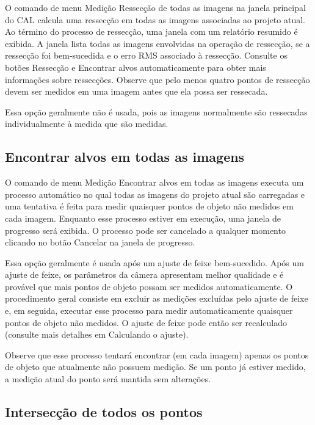 \documentclass[
  12pt,
  letterpaper,
  DIV=11,
  numbers=noendperiod]{scrreprt}
\begin{document}
O comando de menu Medição \textbar{} Ressecção de todas as imagens na
janela principal do CAL calcula uma ressecção em todas as imagens
associadas ao projeto atual. Ao término do processo de ressecção, uma
janela com um relatório resumido é exibida. A janela lista todas as
imagens envolvidas na operação de ressecção, se a ressecção foi
bem-sucedida e o erro RMS associado à ressecção. Consulte os botões
Ressecção e Encontrar alvos automaticamente para obter mais informações
sobre ressecções. Observe que pelo menos quatro pontos de ressecção
devem ser medidos em uma imagem antes que ela possa ser ressecada.

Essa opção geralmente não é usada, pois as imagens normalmente são
ressecadas individualmente à medida que são medidas.

\subsection{Encontrar alvos em todas as
imagens}\label{encontrar-alvos-em-todas-as-imagens-1}

O comando de menu Medição \textbar{} Encontrar alvos em todas as imagens
executa um processo automático no qual todas as imagens do projeto atual
são carregadas e uma tentativa é feita para medir quaisquer pontos de
objeto não medidos em cada imagem. Enquanto esse processo estiver em
execução, uma janela de progresso será exibida. O processo pode ser
cancelado a qualquer momento clicando no botão Cancelar na janela de
progresso.

Essa opção geralmente é usada após um ajuste de feixe bem-sucedido. Após
um ajuste de feixe, os parâmetros da câmera apresentam melhor qualidade
e é provável que mais pontos de objeto possam ser medidos
automaticamente. O procedimento geral consiste em excluir as medições
excluídas pelo ajuste de feixe e, em seguida, executar esse processo
para medir automaticamente quaisquer pontos de objeto não medidos. O
ajuste de feixe pode então ser recalculado (consulte mais detalhes em
Calculando o ajuste).

Observe que esse processo tentará encontrar (em cada imagem) apenas os
pontos de objeto que atualmente não possuem medição. Se um ponto já
estiver medido, a medição atual do ponto será mantida sem alterações.

\subsection{Intersecção de todos os
pontos}\label{intersecuxe7uxe3o-de-todos-os-pontos-1}
\end{document}

